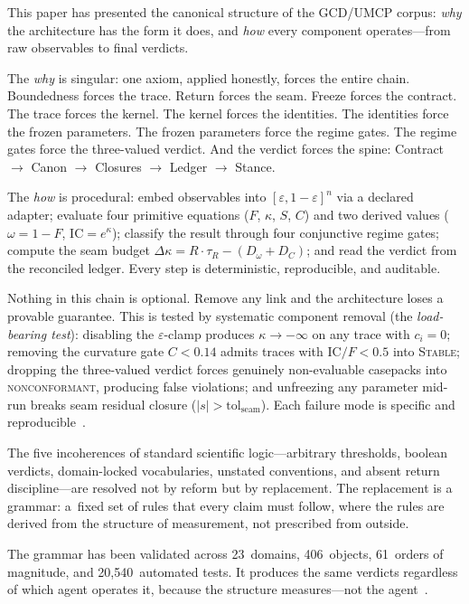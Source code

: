 \documentclass[
  aps,
  prd,
  twocolumn,
  superscriptaddress,
  nofootinbib,
  floatfix
]{revtex4-2}
\newcommand{\tR}{\tau_{\!R}}
\newcommand{\eps}{\varepsilon}
\newcommand{\tolseam}{\mathrm{tol}_{\mathrm{seam}}}
\newcommand{\regime}[1]{\textrm{\upshape\scshape#1}}
\newcommand{\IC}{\mathrm{IC}}
\begin{document}
This paper has presented the canonical structure of the GCD/UMCP
corpus: \emph{why} the architecture has the form it does, and
\emph{how} every component operates---from raw observables to
final verdicts.

The \emph{why} is singular: one axiom, applied honestly, forces
the entire chain.  Boundedness forces the trace.  Return forces
the seam.  Freeze forces the contract.  The trace forces the
kernel.  The kernel forces the identities.  The identities force
the frozen parameters.  The frozen parameters force the regime
gates.  The regime gates force the three-valued verdict.  And
the verdict forces the spine:
Contract $\to$ Canon $\to$ Closures $\to$ Ledger $\to$ Stance.

The \emph{how} is procedural: embed observables into
$[\eps, 1{-}\eps]^n$ via a declared adapter; evaluate
four primitive equations ($F$, $\kappa$, $S$, $C$) and two
derived values ($\omega = 1 - F$, $\IC = e^\kappa$); classify
the result through four conjunctive regime gates; compute the
seam budget $\Delta\kappa = R \cdot \tR - (D_\omega + D_C)$;
and read the verdict from the reconciled ledger.  Every
step is deterministic, reproducible, and auditable.

Nothing in this chain is optional.  Remove any link and the
architecture loses a provable guarantee.  This is tested by
systematic component removal (the \emph{load-bearing test}):
disabling the $\eps$-clamp produces $\kappa \to -\infty$ on
any trace with $c_i = 0$; removing the curvature gate $C < 0.14$
admits traces with $\IC/F < 0.5$ into \regime{Stable}; dropping
the three-valued verdict forces genuinely non-evaluable
casepacks into \regime{nonconformant}, producing false
violations; and unfreezing any parameter mid-run breaks seam
residual closure ($|s| > \tolseam$).
Each failure mode is specific and reproducible~\cite{umcpmetadatarepo}.

The five incoherences of standard scientific
logic---arbitrary thresholds, boolean verdicts, domain-locked
vocabularies, unstated conventions, and absent return
discipline---are resolved not by reform but by replacement.
The replacement is a grammar: a~fixed set of rules that
every claim must follow, where the rules are derived from
the structure of measurement, not prescribed from outside.

The grammar has been validated across 23~domains, 406~objects,
61~orders of magnitude, and 20{,}540~automated tests.  It produces
the same verdicts regardless of which agent operates it, because
the structure measures---not the agent~\cite{paulus2025umcp}.
\end{document}
